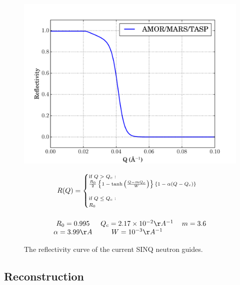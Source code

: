 \documentclass[a4paper]{jpconf}
\begin{document}
\begin{figure}[h]
\begin{minipage}{14pc}
\includegraphics[scale=.4]{graphics/refl.pdf}
\caption{\label{SINQ_reflectivity} The reflectivity curve of the current SINQ neutron guides.}
\end{minipage}\hspace{5pc}%
\begin{minipage}{11pc}
\begin{multline}\label{eq:ref}\scriptsize
R(Q) = 
\begin{cases}
    \mbox{if } Q > Q_c : \\
    \frac{R_0}{2}\left\{  1 - \tanh\left(  \frac{Q - m Q_c}{W}\right) \right\}\{1-\alpha(Q-Q_c)\} \\
    \\
    \mbox{if } Q \leq Q_c :\\
    R_0 \\
\end{cases} \\ \\ 
\begin{tabular}{c c c}
$R_0=0.995$ & $Q_c=2.17\times10^{-2}\AA^{-1}$ & $m=3.6$ \\ 
$\alpha=3.99 \AA$ & $W=10^{-3} \AA^{-1}$ 
\end{tabular}
\end{multline}
\end{minipage} 
\end{figure}


\cite{mcnpx_reflectivity}


\subsection{Reconstruction}
\end{document}
